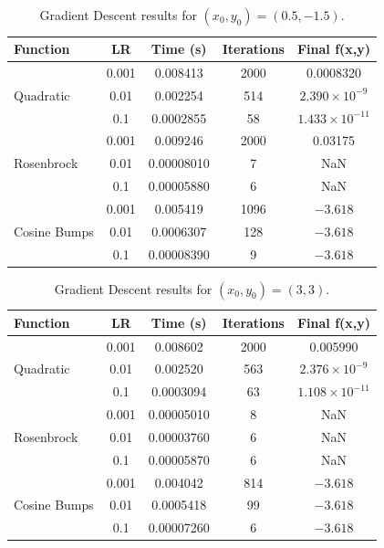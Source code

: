 \documentclass[conference]{IEEEtran}
\begin{document}
\begin{table}[H]
    \centering
    \caption{Gradient Descent results for $(x_0,y_0) = (0.5,-1.5)$.}
    \label{tab:gd_05_neg15}
    \begin{tabular}{lcccc}
        \hline
        \textbf{Function} & \textbf{LR} & \textbf{Time (s)} &
        \textbf{Iterations} & \textbf{Final f(x,y)} \\
        \hline

        \multirow{3}{*}{Quadratic}
        & 0.001 & 0.008413 & 2000 & 0.0008320 \\
        & 0.01  & 0.002254 & 514 & $2.390\times10^{-9}$ \\
        & 0.1   & 0.0002855 & 58 & $1.433\times10^{-11}$ \\
        \hline

        \multirow{3}{*}{Rosenbrock}
        & 0.001 & 0.009246 & 2000 & 0.03175 \\
        & 0.01  & 0.00008010 & 7 & NaN \\
        & 0.1   & 0.00005880 & 6 & NaN \\
        \hline

        \multirow{3}{*}{Cosine Bumps}
        & 0.001 & 0.005419 & 1096 & $-3.618$ \\
        & 0.01  & 0.0006307 & 128 & $-3.618$ \\
        & 0.1   & 0.00008390 & 9 & $-3.618$ \\
        \hline

    \end{tabular}
\end{table}

\begin{table}[H]
    \centering
    \caption{Gradient Descent results for $(x_0,y_0) = (3,3)$.}
    \label{tab:gd_3_3}
    \begin{tabular}{lcccc}
        \hline
        \textbf{Function} & \textbf{LR} & \textbf{Time (s)} &
        \textbf{Iterations} & \textbf{Final f(x,y)} \\
        \hline

        \multirow{3}{*}{Quadratic}
        & 0.001 & 0.008602 & 2000 & 0.005990 \\
        & 0.01  & 0.002520 & 563 & $2.376\times10^{-9}$ \\
        & 0.1   & 0.0003094 & 63 & $1.108\times10^{-11}$ \\
        \hline

        \multirow{3}{*}{Rosenbrock}
        & 0.001 & 0.00005010 & 8 & NaN \\
        & 0.01  & 0.00003760 & 6 & NaN \\
        & 0.1   & 0.00005870 & 6 & NaN \\
        \hline

        \multirow{3}{*}{Cosine Bumps}
        & 0.001 & 0.004042 & 814 & $-3.618$ \\
        & 0.01  & 0.0005418 & 99 & $-3.618$ \\
        & 0.1   & 0.00007260 & 6 & $-3.618$ \\
        \hline

    \end{tabular}
\end{table}
\end{document}
